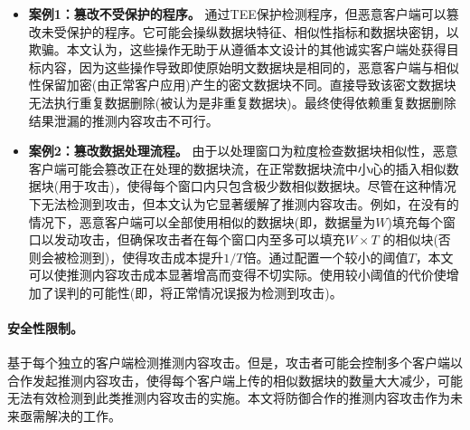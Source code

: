 \begin{itemize}[leftmargin=0em]
    \item \textbf{案例1：篡改不受保护的程序。}
          \sysnameF 通过TEE保护检测程序，但恶意客户端可以篡改未受保护的程序。它可能会操纵数据块特征、相似性指标和数据块密钥，以欺骗\sysnameF。本文认为，这些操作无助于从遵循本文设计的其他诚实客户端处获得目标内容，因为这些操作导致即使原始明文数据块是相同的，恶意客户端与相似性保留加密(由正常客户应用)产生的密文数据块不同。直接导致该密文数据块无法执行重复数据删除(被认为是非重复数据块)。最终使得依赖重复数据删除结果泄漏的推测内容攻击不可行。
    \item \textbf{案例2：篡改数据处理流程。}
          由于\sysnameF 以处理窗口为粒度检查数据块相似性，恶意客户端可能会篡改正在处理的数据块流，在正常数据块流中小心的插入相似数据块(用于攻击)，使得每个窗口内只包含极少数相似数据块。尽管\sysnameF 在这种情况下无法检测到攻击，但本文认为它显著缓解了推测内容攻击。例如，在没有\sysnameF 的情况下，恶意客户端可以全部使用相似的数据块(即，数据量为$W$)填充每个窗口以发动攻击，但\sysnameF 确保攻击者在每个窗口内至多可以填充$W\times T$ 的相似块(否则会被检测到)，使得攻击成本提升$1/T$倍。通过配置一个较小的阈值$T$，本文可以使推测内容攻击成本显著增高而变得不切实际。使用较小阈值的代价使增加了误判的可能性(即，将正常情况误报为检测到攻击)。
\end{itemize}

\paragraph*{安全性限制。}\sysnameF 基于每个独立的客户端检测推测内容攻击。但是，攻击者可能会控制多个客户端以合作发起推测内容攻击，使得每个客户端上传的相似数据块的数量大大减少，\sysnameF 可能无法有效检测到此类推测内容攻击的实施。本文将防御合作的推测内容攻击作为未来亟需解决的工作。